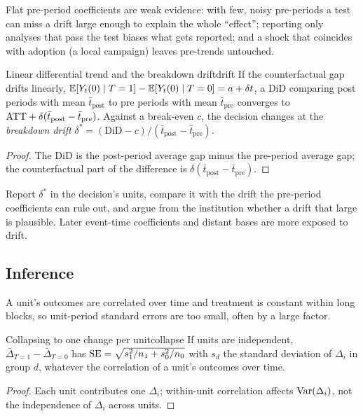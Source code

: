 \documentclass[11pt]{article}
\begin{document}
Flat pre-period coefficients are weak evidence: with few, noisy pre-periods a test can miss a drift large enough to explain the whole
``effect''; reporting only analyses that pass the test biases what gets reported; and a shock that coincides with adoption (a local campaign)
leaves pre-trends untouched.

\begin{prop}{Linear differential trend and the breakdown drift}{drift}
If the counterfactual gap drifts linearly, $\mathbb{E}[Y_t(0) \mid T=1] - \mathbb{E}[Y_t(0) \mid T=0] = a + \delta t$, a DiD comparing post periods with mean
$\bar t_{\text{post}}$ to pre periods with mean $\bar t_{\text{pre}}$ converges to $\text{ATT} + \delta(\bar t_{\text{post}} - \bar t_{\text{pre}})$. Against a break-even $c$,
the decision changes at the \emph{breakdown drift} $\delta^\ast = (\text{DiD} - c)/(\bar t_{\text{post}} - \bar t_{\text{pre}})$.
\end{prop}
\begin{proof}
The DiD is the post-period average gap minus the pre-period average gap; the counterfactual part of the difference is
$\delta(\bar t_{\text{post}} - \bar t_{\text{pre}})$.
\end{proof}

Report $\delta^\ast$ in the decision's units, compare it with the drift the pre-period coefficients can rule out, and argue from the institution
whether a drift that large is plausible. Later event-time coefficients and distant bases are more exposed to drift.

\subsection{Inference}

A unit's outcomes are correlated over time and treatment is constant within long blocks, so unit-period standard errors are too small, often
by a large factor.

\begin{prop}{Collapsing to one change per unit}{collapse}
If units are independent, $\bar\Delta_{T=1} - \bar\Delta_{T=0}$ has $\operatorname{SE} = \sqrt{s_1^2/n_1 + s_0^2/n_0}$ with $s_d$ the standard deviation of $\Delta_i$ in
group $d$, whatever the correlation of a unit's outcomes over time.
\end{prop}
\begin{proof}
Each unit contributes one $\Delta_i$; within-unit correlation affects $\operatorname{Var}(\Delta_i)$, not the independence of $\Delta_i$ across units.
\end{proof}
\end{document}
